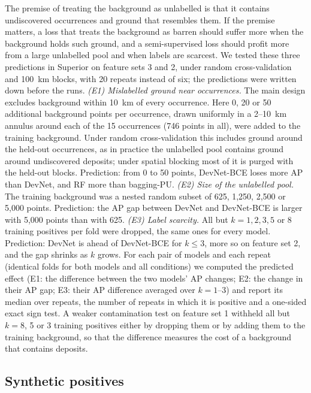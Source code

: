 \documentclass[pdflatex,sn-apa]{sn-jnl}
\begin{document}
The premise of treating the background as unlabelled is that it contains undiscovered occurrences and ground that resembles them. If the premise matters, a loss that treats the background as barren should suffer more when the background holds such ground, and a semi-supervised loss should profit more from a large unlabelled pool and when labels are scarcest. We tested these three predictions in Superior on feature sets 3 and 2, under random cross-validation and 100~km blocks, with 20 repeats instead of six; the predictions were written down before the runs.
\textit{(E1) Mislabelled ground near occurrences.} The main design excludes background within 10~km of every occurrence. Here 0, 20 or 50 additional background points per occurrence, drawn uniformly in a 2--10~km annulus around each of the 15 occurrences (746 points in all), were added to the training background. Under random cross-validation this includes ground around the held-out occurrences, as in practice the unlabelled pool contains ground around undiscovered deposits; under spatial blocking most of it is purged with the held-out blocks. Prediction: from 0 to 50 points, DevNet-BCE loses more AP than DevNet, and RF more than bagging-PU.
\textit{(E2) Size of the unlabelled pool.} The training background was a nested random subset of 625, 1,250, 2,500 or 5,000 points. Prediction: the AP gap between DevNet and DevNet-BCE is larger with 5,000 points than with 625.
\textit{(E3) Label scarcity.} All but $k = 1, 2, 3, 5$ or 8 training positives per fold were dropped, the same ones for every model. Prediction: DevNet is ahead of DevNet-BCE for $k \leq 3$, more so on feature set 2, and the gap shrinks as $k$ grows.
For each pair of models and each repeat (identical folds for both models and all conditions) we computed the predicted effect (E1: the difference between the two models' AP changes; E2: the change in their AP gap; E3: their AP difference averaged over $k = 1$--3) and report its median over repeats, the number of repeats in which it is positive and a one-sided exact sign test. A weaker contamination test on feature set 1 withheld all but $k = 8$, 5 or 3 training positives either by dropping them or by adding them to the training background, so that the difference measures the cost of a background that contains deposits.

\subsection{Synthetic positives}\label{sec:augmentation}
\end{document}
